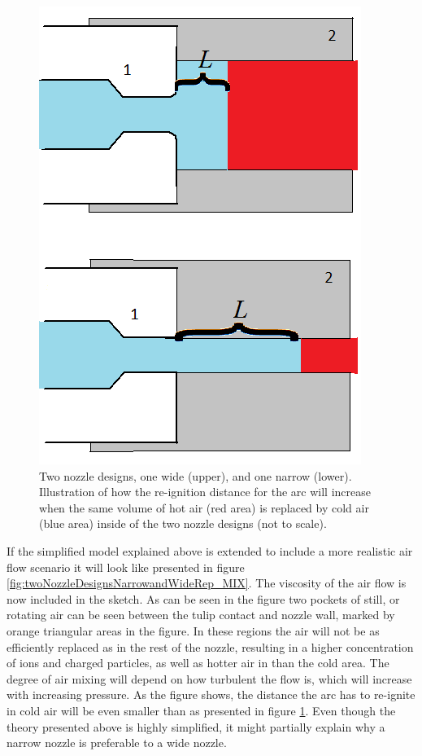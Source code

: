 \documentclass[10pt,b5paper,twoside]{article}
\begin{document}
\begin{figure}[H]
\centering
\includegraphics[scale=0.42]{Bilder/Results/nozzle_cooling_1.png}
\caption{Two nozzle designs, one wide (upper), and one narrow (lower). Illustration of how the re-ignition distance for the arc will increase when the same volume of hot air (red area) is replaced by cold air (blue area) inside of the two nozzle designs (not to scale).} \label{fig:twoNozzleDesignsNarrowandWideRep}
\end{figure}

If the simplified model explained above is extended to include a more realistic air flow scenario it will look like presented in figure \ref{fig:twoNozzleDesignsNarrowandWideRep_MIX}. The viscosity of the air flow is now included in the sketch. As can be seen in the figure two pockets of still, or rotating air can be seen between the tulip contact and nozzle wall, marked by orange triangular areas in the figure. In these regions the air will not be as efficiently replaced as in the rest of the nozzle, resulting in a higher concentration of ions and charged particles, as well as hotter air in than the cold area. The degree of air mixing will depend on how turbulent the flow is, which will increase with increasing pressure. As the figure shows, the distance the arc has to re-ignite in cold air will be even smaller than as presented in figure \ref{fig:twoNozzleDesignsNarrowandWideRep}. Even though the theory presented above is highly simplified, it might partially explain why a narrow nozzle is preferable to a wide nozzle. 
 
\end{document}
